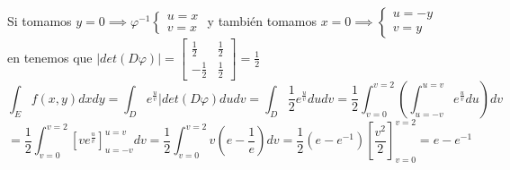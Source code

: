 {\begin{center}
\begin{minipage}{0.45\textwidth}
        \end{minipage}
    \end{center}

    Si tomamos $y = 0 \implies \varphi^{-1} \begin{cases} u = x \\ v = x \end{cases}$ y también tomamos $x = 0 \implies \begin{cases} u = -y \\ v = y \end{cases}$\\
    en tenemos que $|det(D\varphi)| = \begin{bmatrix} \frac{1}{2} & \frac{1}{2} \\ -\frac{1}{2} & \frac{1}{2} \end{bmatrix} = \frac{1}{2}$\\
    $$\int_{E}f(x,y)dxdy = \int_D e^{\frac{u}{v}} |det(D\varphi)du dv = \int_D \frac{1}{2} e^{\frac{u}{v}}du dv = \frac{1}{2} \int_{v = 0}^{v = 2}\left(\int_{u = -v}^{u = v}e^{\frac{u}{v}}du\right)dv$$
    $$  = \frac{1}{2} \int_{v = 0}^{v = 2}\left[v e^{\frac{u}{v}}\right] _{u = -v}^{u = v} dv = \frac{1}{2} \int_{v = 0}^{v =2}v(e-\frac{1}{e})dv = \frac{1}{2}(e-e^{-1}) \left[\frac{v^2}{2}\right]_{v = 0}^{v=2} = e - e^{-1}$$
}
